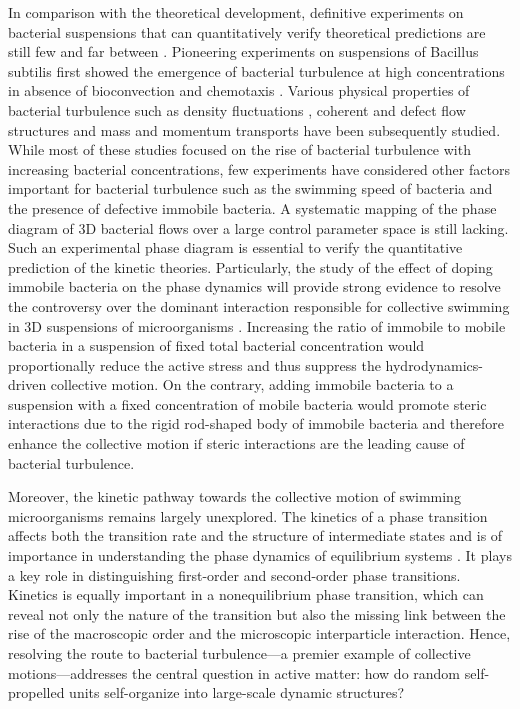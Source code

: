 In comparison with the theoretical development, definitive experiments on bacterial suspensions that can quantitatively verify theoretical predictions are still few and far between \cite{Koch2011, Saintillan2015}.
Pioneering experiments on suspensions of Bacillus subtilis first showed the emergence of bacterial turbulence at high concentrations in absence of bioconvection and chemotaxis \cite{Cisneros2011, Dombrowski2004, Cisneros2007, Sokolov2007, Sokolov2009}.
Various physical properties of bacterial turbulence such as density fluctuations \cite{Sokolov2009}, coherent and defect flow structures \cite{Sokolov2012, Ryan2013, Guo2018, Li2019} and mass and momentum transports \cite{Peng2016, Lopez2015, Liu2019, Yang2016} have been subsequently studied.
While most of these studies focused on the rise of bacterial turbulence with increasing bacterial concentrations, few experiments have considered other factors important for bacterial turbulence such as the swimming speed of bacteria \cite{Sokolov2012, Ryan2013} and the presence of defective immobile bacteria. A systematic mapping of the phase diagram of 3D bacterial flows over a large control parameter space is still lacking. Such an experimental phase diagram is essential to verify the quantitative prediction of the kinetic theories. Particularly, the study of the effect of doping immobile bacteria on the phase dynamics will provide strong evidence to resolve the controversy over the dominant interaction responsible for collective swimming in 3D suspensions of microorganisms \cite{Aranson2007, Ezhilan2013}. Increasing the ratio of immobile to mobile bacteria in a suspension of fixed total bacterial concentration would proportionally reduce the active stress and thus suppress the hydrodynamics-driven collective motion. On the contrary, adding immobile bacteria to a suspension with a fixed concentration of mobile bacteria would promote steric interactions due to the rigid rod-shaped body of immobile bacteria and therefore enhance the collective motion if steric interactions are the leading cause of bacterial turbulence.

Moreover, the kinetic pathway towards the collective motion of swimming microorganisms remains largely unexplored. The kinetics of a phase transition affects both the transition rate and the structure of intermediate states and is of importance in understanding the phase dynamics of equilibrium systems \cite{Peng2015}. It plays a key role in distinguishing first-order and second-order phase transitions. Kinetics is equally important in a nonequilibrium phase transition, which can reveal not only the nature of the transition but also the missing link between the rise of the macroscopic order and the microscopic interparticle interaction. Hence, resolving the route to bacterial turbulence---a premier example of collective motions---addresses the central question in active matter: how do random self-propelled units self-organize into large-scale dynamic structures?

